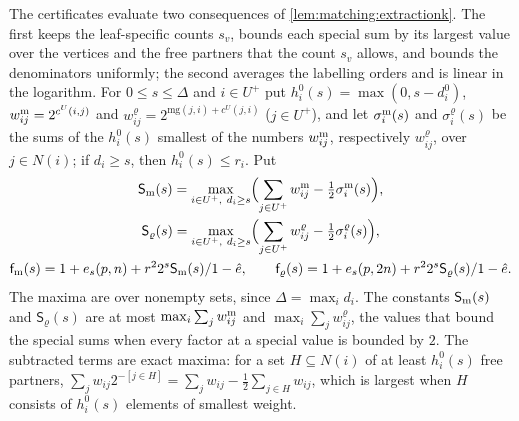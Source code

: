 The certificates evaluate two consequences of
\cref{lem:matching:extractionk}. The first keeps the leaf-specific counts $s_v$,
bounds each special sum by its largest value over the vertices and the free
partners that the count $s_v$ allows, and bounds the denominators uniformly; the
second averages the labelling orders and is linear in the logarithm. For
$0\le s\le\Delta$ and $i\in U^+$ put $h^0_i(s)=\max(0,s-d^0_i)$,
$w^{\rm m}_{ij}=2^{c^U(i,j)}$ and $w^\varrho_{ij}=2^{\mathrm{mg}(j,i)+c^U(j,i)}$
($j\in U^+$), and let $\sigma^{\rm m}_i(s)$ and $\sigma^\varrho_i(s)$ be the sums of
the $h^0_i(s)$ smallest of the numbers $w^{\rm m}_{ij}$, respectively
$w^\varrho_{ij}$, over $j\in N(i)$; if $d_i\ge s$, then $h^0_i(s)\le r_i$. Put
\begin{equation}\label{eq:leaf-factors}
\begin{gathered}
 \mathsf S_{\rm m}(s)=\max_{i\in U^+,\ d_i\ge s}\Bigl(\sum_{j\in U^+}w^{\rm m}_{ij}
 -\tfrac12\sigma^{\rm m}_i(s)\Bigr),\\
 \mathsf S_\varrho(s)=\max_{i\in U^+,\ d_i\ge s}\Bigl(\sum_{j\in U^+}w^\varrho_{ij}
 -\tfrac12\sigma^\varrho_i(s)\Bigr),\\
 \mathsf f_{\rm m}(s)=\frac{1+e_s(p,n)+r^22^s\mathsf S_{\rm m}(s)}{1-\hat e},\qquad
 \mathsf f_\varrho(s)=\frac{1+e_s(p,2n)+r^22^s\mathsf S_\varrho(s)}{1-\hat e}.
\end{gathered}
\end{equation}
The maxima are over nonempty sets, since $\Delta=\max_id_i$. The constants
$\mathsf S_{\rm m}(s)$ and $\mathsf S_\varrho(s)$ are at most
$\max_i\sum_jw^{\rm m}_{ij}$ and $\max_i\sum_jw^\varrho_{ij}$, the values that bound
the special sums when every factor at a special value is bounded by $2$. The
subtracted terms are exact maxima: for a set $H\subseteq N(i)$ of at least
$h^0_i(s)$ free partners,
$\sum_jw_{ij}2^{-[j\in H]}=\sum_jw_{ij}-\frac12\sum_{j\in H}w_{ij}$, which is
largest when $H$ consists of $h^0_i(s)$ elements of smallest weight.

